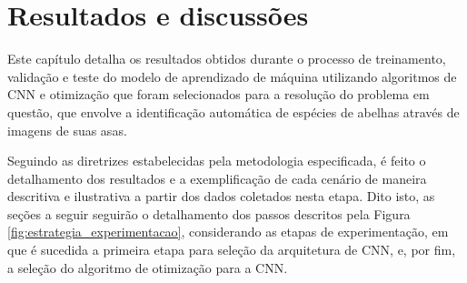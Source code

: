\documentclass[
	12pt,				%
	oneside,			%
	a4paper,			%
	english,			%
	brazil				%
	]{abntex2ppgsi}
\begin{document}

\chapter{Resultados e discussões}
Este capítulo detalha os resultados obtidos durante o processo de treinamento, validação e teste do modelo de aprendizado de máquina utilizando algoritmos de CNN e otimização que foram selecionados para a resolução do problema em questão, que envolve a identificação automática de espécies de abelhas através de imagens de suas asas.

Seguindo as diretrizes estabelecidas pela metodologia especificada, é feito o detalhamento dos resultados e a exemplificação de cada cenário de maneira descritiva e ilustrativa a partir dos dados coletados nesta etapa. Dito isto, as seções a seguir seguirão o detalhamento dos passos descritos pela Figura \ref{fig:estrategia_experimentacao}, considerando as etapas de experimentação, em que é sucedida a primeira etapa para seleção da arquitetura de CNN, e, por fim, a seleção do algoritmo de otimização para a CNN.
\end{document}
